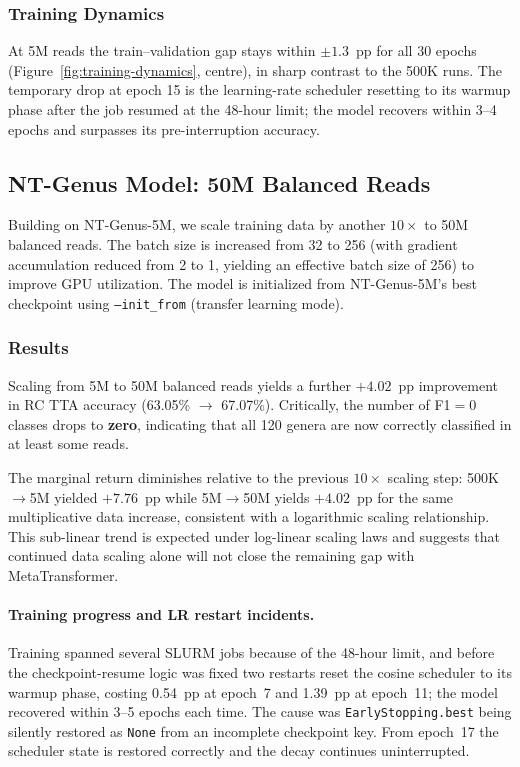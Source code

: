\subsubsection{Training Dynamics}

At 5M reads the train--validation gap stays within $\pm1.3$~pp for all 30 epochs (Figure~\ref{fig:training-dynamics}, centre), in sharp contrast to the 500K runs. The temporary drop at epoch 15 is the learning-rate scheduler resetting to its warmup phase after the job resumed at the 48-hour limit; the model recovers within 3--4 epochs and surpasses its pre-interruption accuracy.

\subsection{NT-Genus Model: 50M Balanced Reads}
\label{sec:exp-v9}

Building on NT-Genus-5M, we scale training data by another $10\times$ to 50M balanced reads. The batch size is increased from 32 to 256 (with gradient accumulation reduced from 2 to 1, yielding an effective batch size of 256) to improve GPU utilization. The model is initialized from NT-Genus-5M's best checkpoint using \texttt{--init\_from} (transfer learning mode).

\subsubsection{Results}

Scaling from 5M to 50M balanced reads yields a further $+4.02$~pp improvement in RC TTA accuracy (63.05\% $\to$ 67.07\%). Critically, the number of F1$=$0 classes drops to \textbf{zero}, indicating that all 120 genera are now correctly classified in at least some reads.

The marginal return diminishes relative to the previous $10\times$ scaling step: 500K$\to$5M yielded $+7.76$~pp while 5M$\to$50M yields $+4.02$~pp for the same multiplicative data increase, consistent with a logarithmic scaling relationship. This sub-linear trend is expected under log-linear scaling laws and suggests that continued data scaling alone will not close the remaining gap with MetaTransformer.

\paragraph{Training progress and LR restart incidents.}
Training spanned several SLURM jobs because of the 48-hour limit, and before the
checkpoint-resume logic was fixed two restarts reset the cosine scheduler to its
warmup phase, costing 0.54~pp at epoch~7 and 1.39~pp at epoch~11; the model recovered
within 3--5 epochs each time. The cause was \texttt{EarlyStopping.best} being silently
restored as \texttt{None} from an incomplete checkpoint key. From epoch~17 the
scheduler state is restored correctly and the decay continues uninterrupted.

